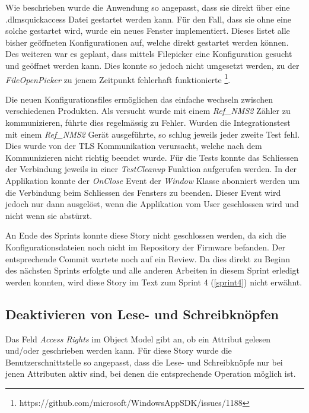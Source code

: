 Wie beschrieben wurde die Anwendung so angepasst, dass sie direkt über eine .dlmsquickaccess Datei gestartet werden kann.
Für den Fall, dass sie ohne eine solche gestartet wird, wurde ein neues Fenster implementiert.
Dieses listet alle bisher geöffneten Konfigurationen auf, welche direkt gestartet werden können.
Des weiteren war es geplant, dass mittels Filepicker eine Konfiguration gesucht und geöffnet werden kann.
Dies konnte so jedoch nicht umgesetzt werden, zu der \textit{FileOpenPicker} zu jenem Zeitpunkt fehlerhaft funktionierte \footnote{https://github.com/microsoft/WindowsAppSDK/issues/1188}.


Die neuen Konfigurationsfiles ermöglichen das einfache wechseln zwischen verschiedenen Produkten.
Als versucht wurde mit einem \textit{Ref\_NMS2} Zähler zu kommunizieren, führte dies regelmässig zu Fehler.
Wurden die Integrationstest mit einem \textit{Ref\_NMS2} Gerät ausgeführte, so schlug jeweils jeder zweite Test fehl.
Dies wurde von der \ac{TLS} Kommunikation verursacht, welche nach dem Kommunizieren nicht richtig beendet wurde.
Für die Tests konnte das Schliessen der Verbindung jeweils in einer \textit{TestCleanup} Funktion aufgerufen werden.
In der Applikation konnte der \textit{OnClose} Event der \textit{Window} Klasse abonniert werden um die Verbindung beim Schliessen des Fensters zu beenden.
Dieser Event wird jedoch nur dann ausgelöst, wenn die Applikation vom User geschlossen wird und nicht wenn sie abstürzt.


An Ende des Sprints konnte diese Story  nicht geschlossen werden, da sich die Konfigurationsdateien noch nicht im Repository der Firmware befanden.
Der entsprechende Commit wartete noch auf ein Review.
Da dies direkt zu Beginn des nächsten Sprints erfolgte und alle anderen Arbeiten in diesem Sprint erledigt werden konnten, wird diese Story im Text zum Sprint 4 (\ref{sprint4}) nicht erwähnt.


\subsection{Deaktivieren von Lese- und Schreibknöpfen}
Das Feld \textit{Access Rights} im Object Model gibt an, ob ein Attribut gelesen und/oder geschrieben werden kann.
Für diese Story wurde die Benutzerschnittstelle so angepasst, dass die Lese- und Schreibknöpfe nur bei jenen Attributen aktiv sind, bei denen die entsprechende Operation möglich ist.
